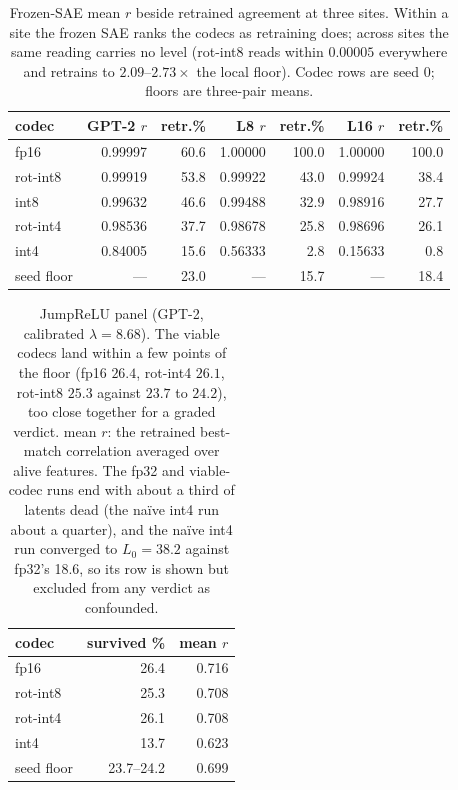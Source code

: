 \begin{table}[htbp]
\caption{Frozen-SAE mean $r$ beside retrained agreement at three sites. Within a site the frozen SAE ranks the codecs as retraining does; across sites the same reading carries no level (rot-int8 reads within $0.00005$ everywhere and retrains to $2.09$--$2.73\times$ the local floor). Codec rows are seed 0; floors are three-pair means.}
\label{tab:transfer}
\centering\small
\begin{tabular}{lrrrrrr}
\toprule
codec & GPT-2 $r$ & retr.\% & L8 $r$ & retr.\% & L16 $r$ & retr.\% \\
\midrule
fp16 & 0.99997 & 60.6 & 1.00000 & 100.0 & 1.00000 & 100.0 \\
rot-int8 & 0.99919 & 53.8 & 0.99922 & 43.0 & 0.99924 & 38.4 \\
int8 & 0.99632 & 46.6 & 0.99488 & 32.9 & 0.98916 & 27.7 \\
rot-int4 & 0.98536 & 37.7 & 0.98678 & 25.8 & 0.98696 & 26.1 \\
int4 & 0.84005 & 15.6 & 0.56333 & 2.8 & 0.15633 & 0.8 \\
\midrule
seed floor & --- & 23.0 & --- & 15.7 & --- & 18.4 \\
\bottomrule
\end{tabular}
\end{table}

\begin{table}[htbp]
\caption{JumpReLU panel (GPT-2, calibrated $\lambda=8.68$). The viable codecs land within a few points of the floor (fp16 $26.4$, rot-int4 $26.1$, rot-int8 $25.3$ against $23.7$ to $24.2$), too close together for a graded verdict. mean $r$: the retrained best-match correlation averaged over alive features. The fp32 and viable-codec runs end with about a third of latents dead (the na\"ive int4 run about a quarter), and the na\"ive int4 run converged to $L_0 = 38.2$ against fp32's 18.6, so its row is shown but excluded from any verdict as confounded.}
\label{tab:jumprelu}
\centering\small
\begin{tabular}{lrr}
\toprule
codec & survived \% & mean $r$ \\
\midrule
fp16 & 26.4 & 0.716 \\
rot-int8 & 25.3 & 0.708 \\
rot-int4 & 26.1 & 0.708 \\
int4 & 13.7 & 0.623 \\
\midrule
seed floor & 23.7--24.2 & 0.699 \\
\bottomrule
\end{tabular}
\end{table}

